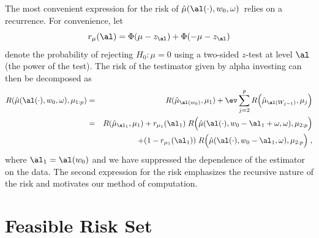 \documentclass[12pt]{article}
\newcommand{\test}{\mbox{$\hat\mu(\al(\cdot),w_0,\omega)$}}
\begin{document}
 The most convenient expression for the risk of \test\ relies on a recurrence.
  For convenience, let
 \begin{equation}
   r_\mu(\al) = \Phi(\mu-z_\al)+\Phi(-\mu-z_\al)   
 \label{eq:rMu}
 \end{equation}
 denote the probability of rejecting $H_0: \mu=0$ using a two-sided $z$-test at
 level $\al$ (the power of the test).  The risk of the testimator given by alpha
 investing can then be decomposed as
 \begin{eqnarray}
   R(\hat\mu(\al(\cdot),w_0,\omega),\mu_{1:p}) 
    &=& R(\hat\mu_{\al(w_0)},\mu_1)
        + \ev \sum_{j=2}^p R\Bigl(\hat\mu_{\al(W_{j-1})},\mu_j\Bigr)  \cr
    &=& R(\hat\mu_{\al_1},\mu_1)
        + r_{\mu_1}(\al_1)\; 
          R\Bigl(\hat\mu(\al(\cdot),w_0-\al_1+\omega,\omega),\mu_{2:p}\Bigr)\cr
    & & \qquad + (1-r_{\mu_1}(\al_1))\; 
          R\Bigl(\hat\mu(\al(\cdot),w_0-\al_1,\omega),\mu_{2:p}\Bigr) \;,
 \label{eq:riskTestAI}
 \end{eqnarray}
 where $\al_1 = \al(w_0)$ and we have suppressed the dependence of the estimator
 on the data.  The second expression for the risk emphasizes the recursive
 nature of the risk and motivates our method of computation.


\section{ Feasible Risk Set }
\end{document}
